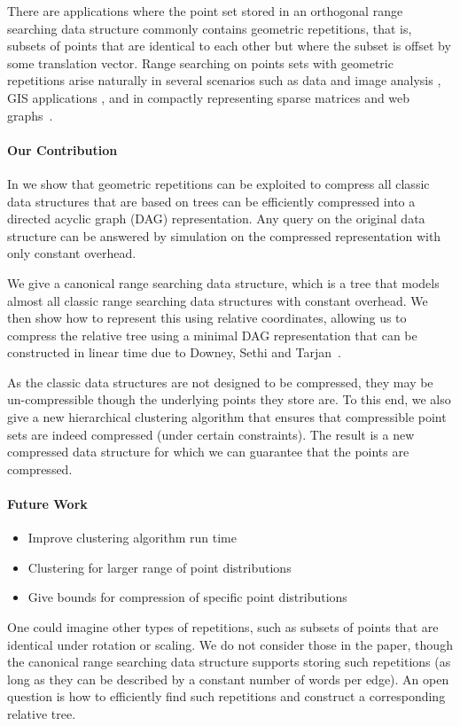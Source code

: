 There are applications where the point set stored in an orthogonal range searching data structure commonly contains geometric repetitions, that is, subsets of points that are identical to each other but where the subset is offset by some translation vector.
Range searching on points sets with geometric repetitions arise naturally in several scenarios such as data and image analysis \cite{tetko2001pattern, pajarola2000image, dick2009a}, GIS applications \cite{schindler2008detecting, zhu2002efficient, haegler2010a, dick2009a}, and in compactly representing sparse matrices and web graphs~\cite{Galli98compressionof, brisaboa2009k2, brisaboaainterleaved, de2013compact}.

\paragraph{Our Contribution} 
In  we show that geometric repetitions can be exploited to compress all classic data structures that are based on trees can be efficiently compressed into a directed acyclic graph (DAG) representation. Any query on the original data structure can be answered by simulation on the compressed representation with only constant overhead. 

We give a canonical range searching data structure, which is a tree that models almost all classic range searching data structures with constant overhead. We then show how to represent this using relative coordinates, allowing us to compress the relative tree using a minimal DAG representation that can be constructed in linear time due to Downey, Sethi and Tarjan~\cite{downey1980variations}.

As the classic data structures are not designed to be compressed, they may be un-compressible though the underlying points they store are. 
To this end, we also give a new hierarchical clustering algorithm that ensures that compressible point sets are indeed compressed (under certain constraints). The result is a new compressed data structure for which we can guarantee that the points are compressed.

\paragraph{Future Work}
\begin{itemize}
    \item Improve clustering algorithm run time
    \item Clustering for larger range of point distributions
    \item Give bounds for compression of specific point distributions
\end{itemize}
One could imagine other types of repetitions, such as subsets of points that are identical under rotation or scaling. We do not consider those in the paper, though the canonical range searching data structure supports storing such repetitions (as long as they can be described by a constant number of words per edge). An open question is how to efficiently find such repetitions and construct a corresponding relative tree.


